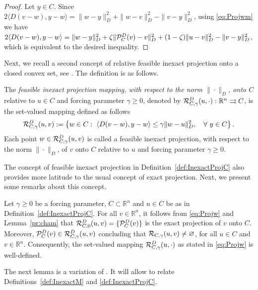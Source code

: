 \begin{proof}
	Let  $y \in C$. Since   $  2\langle D(v-w), y-w\rangle = \|w-y\|_{D}^2 + \|w-v\|_{D}^2-\|v-y\|_{D}^2$,  using \eqref{eq:Projwm}  we have
	$2\langle D(v-w), y-w\rangle = \|w-y\|_{D}^2 + \zeta \| {\cal P}_{C}^{D}(v)-v\|_{D}^2+(1-\zeta)\|u-v\|_{D}^2-\|v-y\|_{D}^2$, which is equivalent to  the desired inequality.
\end{proof}

Next, we recall a second  concept of relative  feasible inexact projection onto a closed convex set, see  \cite{Ademir_Orizon_Leandro2020, OrizonFabianaGilson2018}.  The definition  is as follows.
\begin{definition} \label{def:InexactProjC}
	The {\it feasible inexact projection mapping, with respect to the norm $\| \cdot \|_{D}$,  onto $C$} relative to $u \in C$ and forcing parameter $\gamma\geq 0$, denoted by ${\cal R}_{C,\gamma}^{D}(u, \cdot): {\mathbb R}^n \rightrightarrows C$,  is the set-valued mapping defined as follows
	\begin{equation} \label{eq:Projw}
		{\cal R}_{C,\gamma}^{D}(u, v):= \left\{w\in C:~\left\langle D(v-w), y-w \right\rangle \leq \gamma \|w-u\|_{D}^2, \quad \forall~ y \in C \right\}.
	\end{equation}
	Each point $w\in {\cal R}_{C,\gamma}^{D}(u, v)$ is called a feasible inexact projection,  with respect to the norm $\| \cdot \|_{D}$,  of $v$ onto $C$ relative to $u$ and forcing parameter $\gamma\geq 0$.
\end{definition}
The concept of  feasible inexact projection  in Definition~\ref{def:InexactProjC} also  provides  more latitude to  the usual concept  of exact projection. Next,  we present some remarks about this concept.
\begin{remark}\label{rem: welldef}
	Let $\gamma\geq 0$ be a forcing parameter, $C\subset {\mathbb R}^n$ and $u\in C$ be as in Definition~\ref{def:InexactProjC}.
	For all $v\in {\mathbb R}^n$, it follows from \eqref{eq:Projw} and Lemma~\ref{pr:cham} that ${\cal R}_{C,0}^{D}(u, v)=\{{\cal P}_{C}^{D}(v)\}$ is the exact projection of $v$ onto $C$. Moreover, ${\cal P}_{C}^{D}(v)\in {\cal R}_{C,\gamma}^{D}(u, v)$ concluding  that ${\cal R}_{C, \gamma}(u, v)\neq \varnothing$, for all $u\in C$ and $v\in {\mathbb R}^n$. Consequently, the set-valued mapping ${\cal R}_{C,\gamma}^{D}(u, \cdot)$ as stated in \eqref{eq:Projw} is well-defined.
\end{remark}
The  next lemma is a variation of \cite[Lemma 6]{Reiner_Orizon_Leandro2019}.  It will allow to relate Definitions~\ref{def:InexactM} and \ref{def:InexactProjC}.
